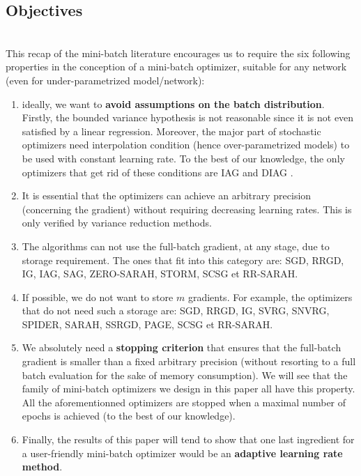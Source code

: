 \documentclass[article,authoryear,jmlmc]{beg_32}             %
\begin{document}
\subsection{Objectives }
\label{obj}
~~\\
This recap of the mini-batch literature encourages us to require the six following properties in the conception of a mini-batch optimizer, suitable for any network (even for under-parametrized model/network):
\begin{enumerate}
	\item ideally, we want to \textbf{avoid assumptions on the batch distribution}. Firstly, the bounded variance hypothesis is not reasonable 
          since it is not even satisfied by a linear regression. Moreover, the major part of stochastic optimizers need interpolation condition (hence over-parametrized models) to be used with constant learning rate. To the best of our knowledge, the only optimizers that get rid of these conditions are IAG and DIAG \cite{DIAG}.
	\item It is essential that the optimizers can achieve an arbitrary precision (concerning the gradient) without requiring decreasing learning rates. This is only verified by variance reduction methods. 
	\item The algorithms can not use the full-batch gradient, at any stage, due to storage requirement. The ones that fit into this category are: SGD, RRGD, IG, IAG, SAG, ZERO-SARAH, STORM, SCSG et RR-SARAH.
	\item If possible, we do not want to store $m$ gradients. For example, the optimizers that do not need such a storage are:  SGD, RRGD, IG, SVRG, SNVRG, SPIDER, SARAH, SSRGD, PAGE, SCSG et RR-SARAH.
        \item We absolutely need a \textbf{stopping criterion} that ensures that the full-batch gradient is smaller than a fixed arbitrary precision (without resorting to a full
          batch evaluation for the sake of memory consumption). 
          We will see that the family of mini-batch optimizers we design in this paper all have this property. 
          All the aforementionned
          optimizers are stopped when a maximal number of epochs is achieved (to the best of our knowledge).
        \item Finally, the results of this paper will tend to show that one last ingredient for a user-friendly mini-batch optimizer would be an \textbf{adaptive learning rate method}. 

\end{enumerate}
\end{document}
